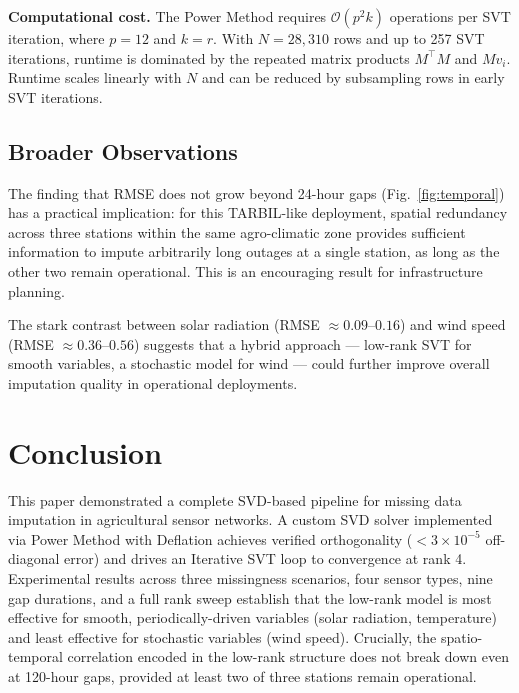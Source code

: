 \documentclass[conference]{IEEEtran}
\begin{document}
\textbf{Computational cost.} The Power Method requires $\mathcal{O}(p^2 k)$ operations per SVT iteration, where $p = 12$ and $k = r$. With $N = 28{,}310$ rows and up to 257 SVT iterations, runtime is dominated by the repeated matrix products $M^\top M$ and $M v_i$. Runtime scales linearly with $N$ and can be reduced by subsampling rows in early SVT iterations.

\subsection{Broader Observations}

The finding that RMSE does not grow beyond 24-hour gaps (Fig.~\ref{fig:temporal}) has a practical implication: for this TARBIL-like deployment, spatial redundancy across three stations within the same agro-climatic zone provides sufficient information to impute arbitrarily long outages at a single station, as long as the other two remain operational. This is an encouraging result for infrastructure planning.

The stark contrast between solar radiation (RMSE $\approx 0.09$–$0.16$) and wind speed (RMSE $\approx 0.36$–$0.56$) suggests that a hybrid approach — low-rank SVT for smooth variables, a stochastic model for wind — could further improve overall imputation quality in operational deployments.

\section{Conclusion}
\label{sec:conclusion}

This paper demonstrated a complete SVD-based pipeline for missing data imputation in agricultural sensor networks. A custom SVD solver implemented via Power Method with Deflation achieves verified orthogonality ($< 3 \times 10^{-5}$ off-diagonal error) and drives an Iterative SVT loop to convergence at rank 4. Experimental results across three missingness scenarios, four sensor types, nine gap durations, and a full rank sweep establish that the low-rank model is most effective for smooth, periodically-driven variables (solar radiation, temperature) and least effective for stochastic variables (wind speed). Crucially, the spatio-temporal correlation encoded in the low-rank structure does not break down even at 120-hour gaps, provided at least two of three stations remain operational.
\end{document}
